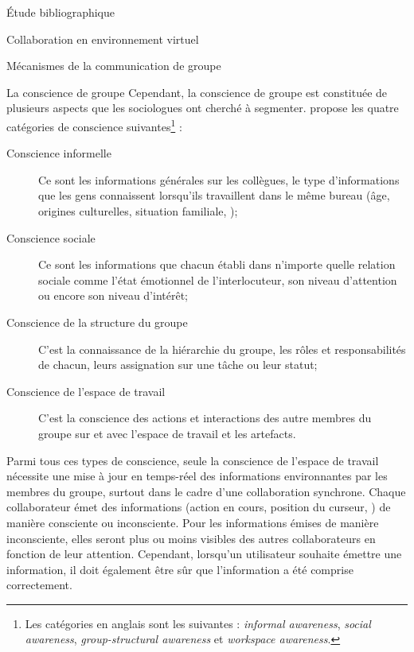 \documentclass[myfrancais,ngerman,english,french]{mythesis}
\begin{document}
\begin{mychapter}{Étude bibliographique}
\begin{mysection}{Collaboration en environnement virtuel}
\begin{mysubsection}{Mécanismes de la communication de groupe}
\begin{mysubsubsection}{La conscience de groupe}
					Cependant, la conscience de groupe est constituée de plusieurs aspects que les sociologues ont cherché à segmenter.
					 propose les quatre catégories de conscience suivantes\footnote{Les catégories en anglais sont les suivantes : \textit{informal awareness}, \textit{social awareness}, \textit{group-structural awareness} et \textit{workspace awareness}.} :
					\begin{description}
						\item[Conscience informelle] Ce sont les informations générales sur les collègues, le type d'informations que les gens connaissent lorsqu'ils travaillent dans le même bureau (âge, origines culturelles, situation familiale, \myetc);
						\item[Conscience sociale] Ce sont les informations que chacun établi dans n'importe quelle relation sociale comme l'état émotionnel de l'interlocuteur, son niveau d'attention ou encore son niveau d'intérêt;
						\item[Conscience de la structure du groupe] C'est la connaissance de la hiérarchie du groupe, les rôles et responsabilités de chacun, leurs assignation sur une tâche ou leur statut;
						\item[Conscience de l'espace de travail] C'est la conscience des actions et interactions des autre membres du groupe sur et avec l'espace de travail et les artefacts.
					\end{description}

					Parmi tous ces types de conscience, seule la conscience de l'espace de travail nécessite une mise à jour en temps-réel des informations environnantes par les membres du groupe, surtout dans le cadre d'une collaboration synchrone.
					Chaque collaborateur émet des informations (action en cours, position du curseur, \myetc) de manière consciente ou inconsciente.
					Pour les informations émises de manière inconsciente, elles seront plus ou moins visibles des autres collaborateurs en fonction de leur attention.
					Cependant, lorsqu'un utilisateur souhaite émettre une information, il doit également être sûr que l'information a été comprise correctement.


\end{mysubsubsection}
\end{mysubsection}
\end{mysection}
\end{mychapter}
\end{document}
